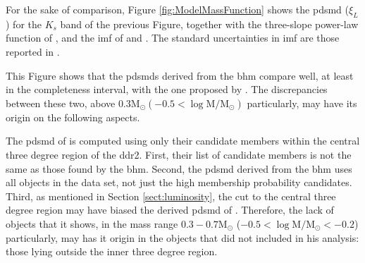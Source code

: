For the sake of comparison, Figure \ref{fig:ModelMassFunction} shows the \gls{pdsmd} ($\xi_L$) for the $K_s$ band of the previous Figure, together with the three-slope power-law function of \citet{Bouy2015}, and the \gls{imf} of \citet{Thies2007} and \citet{Chabrier2005}. The standard uncertainties in \citet{Chabrier2005} \gls{imf} are those reported in \citet{Chabrier2003b}. 

This Figure shows that the \glspl{pdsmd} derived from the \gls{bhm} compare well, at least in the completeness interval, with the one proposed by \citet{Bouy2015}. The discrepancies between these two, above $0.3 \mathrm{M_{\odot}} (-0.5 < \log \mathrm{M/M_{\odot}})$ particularly, may have its origin on the following aspects.

The \gls{pdsmd} of \citet{Bouy2015} is computed using only their candidate members within the central three degree region of the \gls{ddr2}. First, their list of candidate members is not the same as those found by the \gls{bhm}. Second, the \gls{pdsmd} derived from the \gls{bhm} uses all objects in the data set, not just the high membership probability candidates. Third, as mentioned in Section \ref{sect:luminosity}, the cut to the central three degree region may have biased the derived \gls{pdsmd} of \citet{Bouy2015}. Therefore, the lack of objects that it shows,  in the mass range $0.3 - 0.7 \mathrm{M_{\odot}}$ ($-0.5 < \log \mathrm{M/M_{\odot}} < -0.2$) particularly, may has it origin in the objects that \citet{Bouy2015} did not included in his analysis: those lying outside the inner three degree region. 

